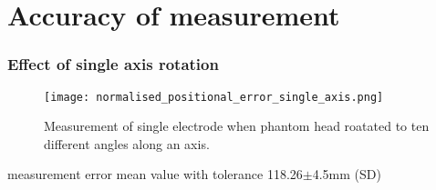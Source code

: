 \section{Accuracy of measurement}
\begin{frame}
	\frametitle{Effect of single axis rotation}
	\begin{figure}[hbt!]
		\centering
		\texttt{[image: normalised\_positional\_error\_single\_axis.png]}
		\caption{Measurement of single electrode when phantom head roatated to ten different angles along an axis.} 
		\label{fig:Normalised_positional_error_single_axis}
	\end{figure}
	
\begin{block}{measurement error}
		mean value with tolerance 118.26$\pm$4.5mm (SD)
\end{block}
		
\end{frame}


